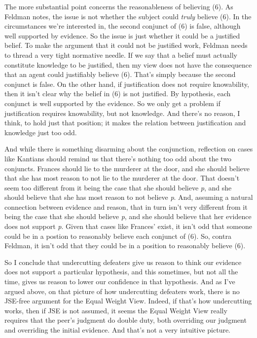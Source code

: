 \documentclass[
  10pt,
  letterpaper,
  DIV=11,
  numbers=noendperiod,
  twoside]{scrartcl}
\begin{document}
The more substantial point concerns the reasonableness of believing (6).
As Feldman notes, the issue is not whether the subject could
\emph{truly} believe (6). In the circumstances we're interested in, the
second conjunct of (6) is false, although well supported by evidence. So
the issue is just whether it could be a justified belief. To make the
argument that it could not be justified work, Feldman needs to thread a
very tight normative needle. If we say that a belief must actually
constitute knowledge to be justified, then my view does not have the
consequence that an agent could justifiably believe (6). That's simply
because the second conjunct is false. On the other hand, if
justification does not require knowability, then it isn't clear why the
belief in (6) is not justified. By hypothesis, each conjunct is well
supported by the evidence. So we only get a problem if justification
requires knowability, but not knowledge. And there's no reason, I think,
to hold just that position; it makes the relation between justification
and knowledge just too odd.

And while there is something disarming about the conjunction, reflection
on cases like Kantians should remind us that there's nothing too odd
about the two conjuncts. Frances should lie to the murderer at the door,
and she should believe that she has most reason to not lie to the
murderer at the door. That doesn't seem too different from it being the
case that she should believe \emph{p}, and she should believe that she
has most reason to not believe \emph{p}. And, assuming a natural
connection between evidence and reason, that in turn isn't very
different from it being the case that she should believe \emph{p}, and
she should believe that her evidence does not support \emph{p}. Given
that cases like Frances' exist, it isn't odd that someone could be in a
postion to reasonably believe each conjunct of (6). So, contra Feldman,
it isn't odd that they could be in a position to reasonably believe (6).

So I conclude that undercutting defeaters give us reason to think our
evidence does not support a particular hypothesis, and this sometimes,
but not all the time, gives us reason to lower our confidence in that
hypothesis. And as I've argued above, on that picture of how
undercutting defeaters work, there is no JSE-free argument for the Equal
Weight View. Indeed, if that's how undercutting works, then if JSE is
not assumed, it seems the Equal Weight View really requires that the
peer's judgment do double duty, both overriding our judgment and
overriding the initial evidence. And that's not a very intuitive
picture.
\end{document}
